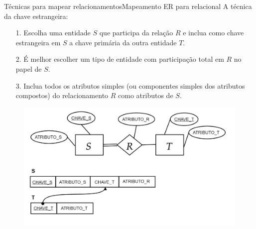 \documentclass[t]{beamer}
\begin{document}

\begin{ftst}{Técnicas para mapear relacionamentos}{Mapeamento ER para relacional}
A técnica da chave estrangeira:
\footnotesize
\begin{itemize}
    \item[1.]  Escolha uma entidade $S$ que participa da relação $R$ e inclua como chave estrangeira em $S$ a chave primária da outra entidade $T$. 
    \item[2.] É melhor escolher um tipo de entidade com participação total em $R$ no papel de $S$.
    \item[3.] Inclua todos os atributos simples (ou componentes simples dos atributos compostos) do relacionamento $R$ como atributos de $S$.
\end{itemize}
\begin{figure}
    \includegraphics[scale=0.15]{Figuras/03_06.png}
\end{figure}
\end{ftst}

\end{document}
